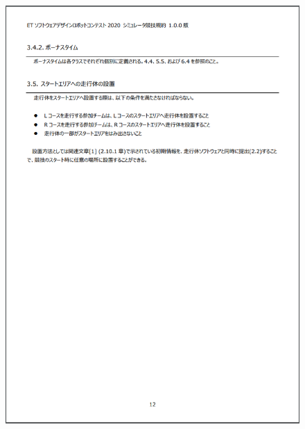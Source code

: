 \documentclass[uplatex, report, a4j, 10pt]{jsbook}
\begin{document}
\begin{figure}[tp]
    \begin{center}
    \includegraphics[width=\hsize]{specification/ET_9.eps}
    \end{center}
\end{figure}
\end{document}
